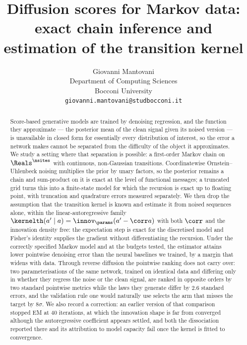 \documentclass{article}
\title{Diffusion scores for Markov data:\\
exact chain inference and estimation of the transition kernel}
\author{%
  Giovanni Mantovani \\
  Department of Computing Sciences \\
  Bocconi University \\
  \texttt{giovanni.mantovani@studbocconi.it}
}
\begin{document}
\maketitle

\begin{center}
\end{center}

\begin{abstract}
Score-based generative models are trained by denoising regression, and the function they
approximate --- the posterior mean of the clean signal given its noised version --- is
unavailable in closed form for essentially every distribution of interest, so the error a network
makes cannot be separated from the difficulty of the object it approximates. We study a setting
where that separation is possible: a first-order Markov chain on $\Reals^{\nsites}$ with
continuous, non-Gaussian transitions. Coordinatewise Ornstein--Uhlenbeck noising multiplies the
prior by unary factors, so the posterior remains a chain and sum-product on it is exact at the
level of functional messages; a truncated grid turns this into a finite-state model for which the
recursion is exact up to floating point, with truncation and quadrature errors measured
separately. We then drop the assumption that the transition kernel is known and estimate it from
noised sequences alone, within the linear-autoregressive family
$\kernelth(a'\mid a) = \innov_\params(a' - \corr a)$ with both $\corr$ and the innovation density
free: the expectation step is exact for the discretised model and Fisher's identity supplies the
gradient without differentiating the recursion. Under the correctly specified Markov model and at
the budgets tested, the estimator attains lower pointwise denoising error than the neural
baselines we trained, by a margin that widens with data. Through reverse diffusion the pointwise
ranking does not carry over: two parameterisations of the same network, trained on identical data
and differing only in whether they regress the noise or the clean signal, are ranked in opposite
orders by two standard pointwise metrics while the laws they generate differ by $2.6$ standard
errors, and the validation rule one would naturally use selects the arm that misses the target by
$8\sigma$. We also record a correction: an earlier version of that comparison stopped EM at $40$
iterations, at which the innovation shape is far from converged although the autoregressive
coefficient appears settled, and both the dissociation reported there and its attribution to
model capacity fail once the kernel is fitted to convergence.
\end{abstract}
\end{document}

